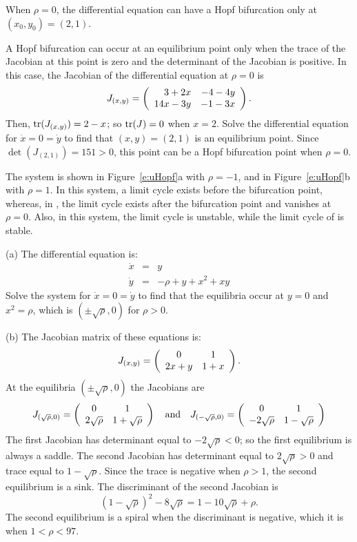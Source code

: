 \documentclass{ximera}
\begin{document}
\begin{figure}[htb]
                       \centerline{%
                       }
\end{figure}

\ans When $\rho = 0$, the differential equation can have a Hopf bifurcation 
only at $(x_0,y_0) = (2,1)$.

\soln A Hopf bifurcation can occur at an equilibrium point only when the 
trace of the Jacobian at this point is zero and the determinant of the 
Jacobian is positive.  In this case, the Jacobian of the differential 
equation at $\rho = 0$ is
\[
J_{(x,y)} = \left(\begin{array}{rr} 3 + 2x & -4 - 4y\\ 14x - 3y &-1 - 3x\end{array}\right).
\]
Then, ${\rm tr}(J_{(x,y)}) = 2 - x$; so ${\rm tr}(J) = 0$ when $x = 2$.  Solve
the differential equation for $\dot{x} = 0 = \dot{y}$ to find that $(x,y) =
(2,1)$ is an equilibrium point.  Since $\det(J_{(2,1)}) = 151 > 0$, this 
point can be a Hopf bifurcation point when $\rho = 0$.

The system is shown in Figure~\ref{e:uHopf}a with $\rho = -1$, and in
Figure~\ref{e:uHopf}b with $\rho = 1$.  In this system, a limit cycle
exists before the bifurcation point, whereas, in , the
limit cycle exists after the bifurcation point and vanishes at
$\rho = 0$.  Also, in this system, the limit cycle is unstable, while
the limit cycle of  is stable.

\begin{figure}[htb]
                       \centerline{%
                       }
\end{figure}

 \soln
(a) The differential equation  is:
\[
\begin{array}{rcl}
\dot{x} & = &  y \\
\dot{y} & = &  -\rho + y + x^2 + xy
\end{array}
\]
Solve the system for $\dot{x} = 0 = \dot{y}$ to find that the equilibria
occur at $y = 0$ and $x^2 = \rho$, which is $(\pm\sqrt{\rho},0)$
for $\rho > 0$.

(b)  The Jacobian matrix of these equations is:
\[
J_{(x,y)} = \left(\begin{array}{cc} 0 & 1\\ 2x+y &1+x\end{array}\right).
\]
At the equilibria $(\pm\sqrt{\rho},0)$ the Jacobians are
\[
J_{(\sqrt{\rho},0)}= \left(\begin{array}{cc} 0 & 1\\ 2\sqrt{\rho} &1+\sqrt{\rho}\end{array}\right) 
\quad\mbox{and}\quad
J_{(-\sqrt{\rho},0)}= \left(\begin{array}{cc} 0 & 1\\ -2\sqrt{\rho} &1-\sqrt{\rho}\end{array}\right)
\]
The first Jacobian has determinant equal to $-2\sqrt{\rho}<0$; so the
first equilibrium is always a saddle.  The second Jacobian has determinant
equal to $2\sqrt{\rho}>0$ and trace equal to $1-\sqrt{\rho}$.  Since the
trace is negative when $\rho>1$, the second equilibrium is a sink.  The
discriminant of the second Jacobian is 
\[
(1-\sqrt{\rho})^2-8\sqrt{\rho}=1-10\sqrt{\rho}+\rho.
\]
The second equilibrium is a spiral when the discriminant is negative, which
it is when $1<\rho<97$.
\end{document}
